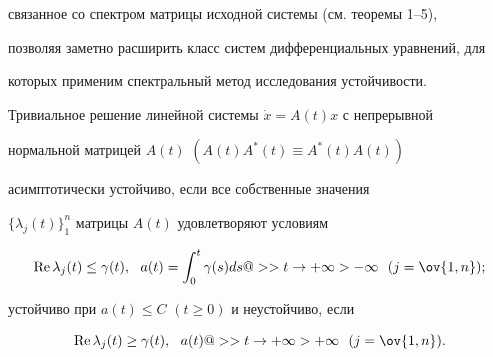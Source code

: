 связанное со спектром матрицы исходной системы (см. теоремы 1--5), 


позволяя заметно расширить класс систем дифференциальных уравнений, для 


которых применим спектральный метод исследования устойчивости.





\begin{thm}


Тривиальное решение линейной системы $\Dot x=A(t)x$ с непрерывной 


нормальной матрицей $A(t)$ $(A(t)A^*(t)\equiv A^*(t)A(t))$ 


асимптотически устойчиво, если все собственные значения 


$\{\lambda_j(t)\}^n_1$ матрицы $A(t)$ удовлетворяют условиям


$$


\re\lambda_j(t)\le\gamma(t),\ \ a(t)=\int^t_0 \gamma(s)ds


@>>{t\to+\infty}>-\infty\ \ (j=\ov{1,n});


$$


устойчиво при $a(t)\le C$ $(t\ge0)$ и неустойчиво, если


$$


\re\lambda_j(t)\ge\gamma(t),\ \ a(t)@>>{t\to+\infty}>+\infty


\ \ (j=\ov{1,n}).


$$


\end{thm}





